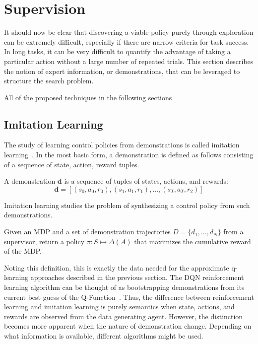 \section{Supervision}
It should now be clear that discovering a viable policy purely through exploration can be extremely difficult, especially if there are narrow criteria for task success.
In long tasks, it can be very difficult to quantify the advantage of taking a particular action without a large number of repeated trials. This section describes the notion of expert information, or demonstrations, that can be leveraged to structure the search problem.

All of the proposed techniques in the following sections 

\subsection*{Imitation Learning}
The study of learning control policies from demonstrations is called imitation learning~\cite{osa2018algorithmic}. In the most basic form, a demonstration is defined as follows consisting of a sequence of state, action, reward tuples. 

\begin{definition}[Demonstration]
A demonstration $\mathbf{d}$ is a sequence of tuples of states, actions, and rewards:
\[\mathbf{d} = [(s_0,a_0,r_0),(s_1,a_1,r_1),...,(s_T,a_T,r_2)]\]
\end{definition}

Imitation learning studies the problem of synthesizing a control policy from such demonstrations.

\begin{problem}
Given an MDP and a set of demonstration trajectories $D = \{d_1,...,d_N\}$ from a supervisor, return a policy $\pi: S \mapsto \Delta(A)$ that maximizes the cumulative reward of the MDP.
\end{problem}

Noting this definition, this is exactly the data needed for the approximate q-learning approaches described in the previous section.
The DQN reinforcement learning algorithm can be thought of as bootstrapping demonstrations from its current best guess of the Q-Function~\cite{mnih2015human}. Thus, the difference between reinforcement learning and imitation learning is purely semantics when state, actions, and rewards are observed from the data generating agent. However, the distinction becomes more apparent when the nature of demonstration change. Depending on what information is available, different algorithms might be used. 


